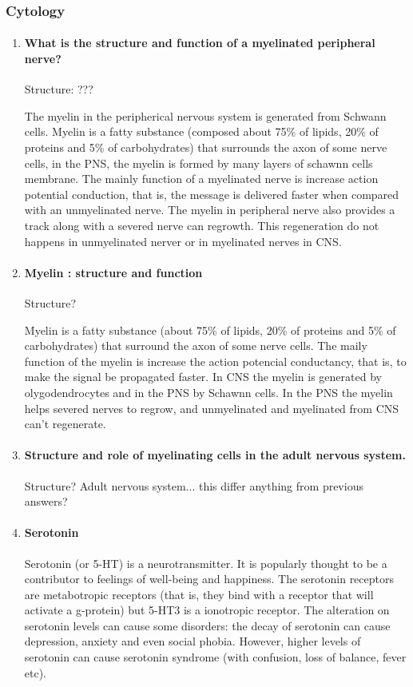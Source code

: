 \documentclass[12pt,article,oneside,a4paper]{memoir}
\begin{document}
\subsubsection{Cytology}
\begin{enumerate}
\item \paragraph{What is the structure and function of a myelinated peripheral nerve?}
Structure: ???

The myelin in the peripherical nervous system is generated from Schwann cells. Myelin is a fatty substance (composed about 75\% of lipids, 20\% of proteins and 5\% of carbohydrates) that surrounds the axon of some nerve cells, in the PNS, the myelin is formed by many layers of schawnn cells membrane. The mainly function of a myelinated nerve is increase action potential conduction, that is, the message is delivered faster when compared with an unmyelinated nerve. The myelin in peripheral nerve also provides a track along with a severed nerve can regrowth. This regeneration do not happens in unmyelinated nerver or in myelinated nerves in CNS.

\item \paragraph{Myelin : structure and function}
Structure?

Myelin is a fatty substance (about 75\% of lipids, 20\% of proteins and 5\% of carbohydrates) that surround the axon of some nerve cells.
The maily function of the myelin is increase the action potencial conductancy, that is, to make the signal be propagated faster. In CNS the myelin is generated by olygodendrocytes and in the PNS by Schawnn cells.
In the PNS the myelin helps severed nerves to regrow, and unmyelinated and myelinated from CNS can't regenerate.

\item \paragraph{Structure and role of myelinating cells in the adult nervous system.}
Structure?
Adult nervous system... this differ anything from previous answers?

\item \paragraph{Serotonin}
Serotonin (or 5-HT) is a neurotransmitter. It is popularly thought to be a contributor to feelings of well-being and happiness.
The serotonin receptors are metabotropic receptors (that is, they bind with a receptor that will activate a g-protein) but 5-HT3 is a ionotropic receptor. The alteration on serotonin levels can cause some disorders: the decay of serotonin can cause depression, anxiety and even social phobia. However, higher levels of serotonin can cause serotonin syndrome (with confusion, loss of balance, fever etc).


\end{enumerate}
\end{document}
